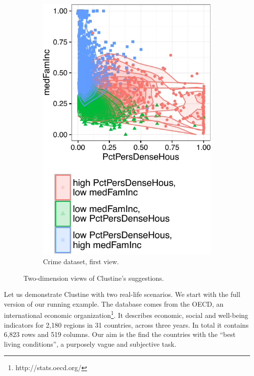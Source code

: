 \begin{figure}[t!]
\begin{subfigure}[b]{0.48\columnwidth}
        \includegraphics[width=\textwidth]{Experiments/CaseValidationResized2}
        \caption{Crime dataset, first view.}
        \label{fig:validation2}
    \end{subfigure}
    \caption{Two-dimension views of Clustine's suggestions.}\label{fig:propvis}
\end{figure}

Let us demonstrate Clustine with two real-life scenarios.  We start with the
full version of our running example. The database comes
from the OECD, an international economic
organization\footnote{http://stats.oecd.org/}. It describes economic, social
and well-being indicators for 2,180 regions in 31 countries, across three
years. In total it contains 6,823 rows and 519 columns. Our aim is the find the
countries with the ``best living conditions'', a purposely vague and subjective
task.

